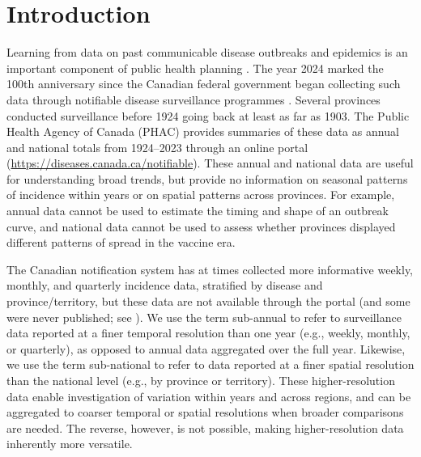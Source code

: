 \documentclass[12pt]{article}
\begin{document}
\newpage

\section{Introduction}\label{sec:intro}

Learning from data on past communicable disease outbreaks and epidemics is an important component of public health planning \cite{ogden2024mathematical}. The year 2024 marked the 100th anniversary since the Canadian federal government began collecting such data through notifiable disease surveillance programmes \cite{summaryNotifiable1954,sockett1996communicable,carter1991establishing,doherty2000establishing,totten2019updates}. Several provinces conducted surveillance before 1924 going back at least as far as 1903. The Public Health Agency of Canada (PHAC) provides summaries of these data as annual and national totals from 1924--2023 through an online portal (\url{https://diseases.canada.ca/notifiable}). These annual and national data are useful for understanding broad trends, but provide no information on seasonal patterns of incidence within years or on spatial patterns across provinces. For example, annual data cannot be used to estimate the timing and shape of an outbreak curve, and national data cannot be used to assess whether provinces displayed different patterns of spread in the vaccine era.

The Canadian notification system has at times collected more informative weekly, monthly, and quarterly incidence data, stratified by disease and province/territory, but these data are not available through the portal (and some were never published; see \cite{summaryNotifiable1954}). We use the term sub-annual to refer to surveillance data reported at a finer temporal resolution than one year (e.g., weekly, monthly, or quarterly), as opposed to annual data aggregated over the full year. Likewise, we use the term sub-national to refer to data reported at a finer spatial resolution than the national level (e.g., by province or territory). These higher-resolution data enable investigation of variation within years and across regions, and can be aggregated to coarser temporal or spatial resolutions when broader comparisons are needed. The reverse, however, is not possible, making higher-resolution data inherently more versatile.
\end{document}
